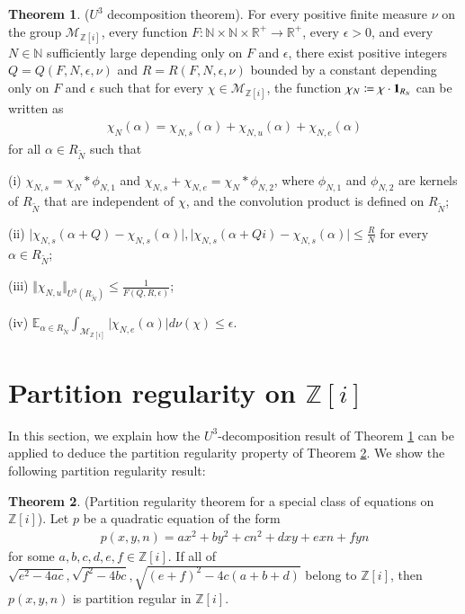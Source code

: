 \documentclass[12pt,amstex]{amsart}
\theoremstyle{definition}
\newtheorem{thm}{Theorem}[section]
\def \Z {\mathbb{Z}[i]}
\def \A {\alpha}
\def \e {\epsilon}
\def \R {R_{\tilde{N}}}
\begin{document}
\begin{thm}\label{nU3s}($U^{3}$ decomposition theorem).
  For every positive finite measure $\nu$ on the group $\mathcal{M}_{\Z}$, every function $F\colon\mathbb{N}\times\mathbb{N}\times\mathbb{R}^{+}\rightarrow\mathbb{R}^{+}$, every $\e>0$, and every $N\in\mathbb{N}$ sufficiently large depending only on $F$ and $\e$, there exist positive integers $Q=Q(F,N,\e,\nu)$ and $R=R(F,N,\e,\nu)$ bounded by a constant depending only on $F$ and $\e$ such that for every $\chi\in\mathcal{M}_{\Z}$, the function $\chi_{N}\coloneqq\chi\cdot\bold{1}_{R_{N}}$ can be written as
  \begin{equation}\nonumber
   \begin{split}
     \chi_{N}(\A)=\chi_{N,s}(\A)+\chi_{N,u}(\A)+\chi_{N,e}(\A)
   \end{split}
  \end{equation}
for all $\A\in\R$ such that

  (i) $\chi_{N,s}=\chi_{N}*\phi_{N,1}$ and $\chi_{N,s}+\chi_{N,e}=\chi_{N}*\phi_{N,2}$, where $\phi_{N,1}$ and $\phi_{N,2}$ are kernels of $\R$ that are independent of $\chi$, and the convolution product is defined on $\R$;

  (ii) $\vert\chi_{N,s}(\A+Q)-\chi_{N,s}(\A)\vert, \vert\chi_{N,s}(\A+Qi)-\chi_{N,s}(\A)\vert\leq\frac{R}{N}$ for every $\A\in \R$;

  (iii) $\Vert\chi_{N,u}\Vert_{U^{3}(\R)}\leq\frac{1}{F(Q,R,\e)}$;

  (iv) $\mathbb{E}_{\A\in \R}\int_{\mathcal{M}_{\Z}}\vert\chi_{N,e}(\A)\vert d\nu(\chi)\leq\e$.
\end{thm}

\section{Partition regularity on $\Z$}
In this section, we explain how the $U^{3}$-decomposition result of Theorem \ref{nU3s} can be applied to deduce the partition regularity property of Theorem \ref{c1}. We show the following partition regularity result:
\begin{thm}\label{c1}(Partition regularity theorem for a special class of equations on $\Z$).
  Let $p$ be a quadratic equation of the form
    \begin{equation}\nonumber
    \begin{split}
      p(x,y,n)=ax^{2}+by^{2}+cn^{2}+dxy+exn+fyn
    \end{split}
  \end{equation}
  for some $a,b,c,d,e,f\in\Z$. If all of $\sqrt{e^{2}-4ac}, \sqrt{f^{2}-4bc},\sqrt{(e+f)^{2}-4c(a+b+d)}$ belong to $\Z$, then
  $p(x,y,n)$ is partition regular in $\Z$.
\end{thm}
\end{document}
